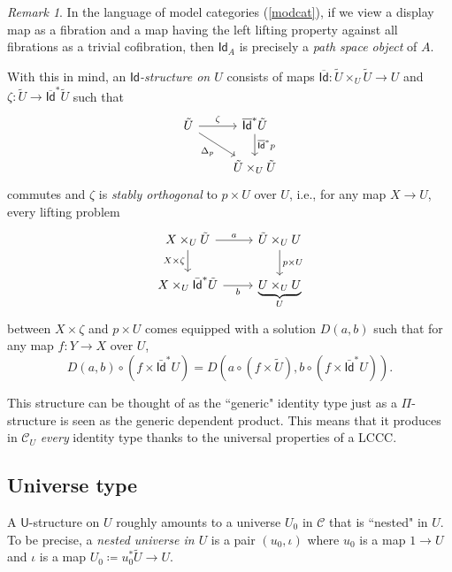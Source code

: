 \documentclass[10pt,letterpaper,cm]{nupset}
\theoremstyle{definition}
\theoremstyle{theorem}
\theoremstyle{remark}
\newtheorem{remark}[definition]{Remark}
\newcommand{\id}{\mathsf{Id}}
\newcommand{\U}{\mathsf{U}}
\newcommand{\0}{\mathbf{0}}
\newcommand{\1}{\mathbf{1}}
\newcommand{\2}{\mathbf{2}}
\renewcommand{\c}{\mathscr{C}}
\begin{document}
\begin{remark}\label{fibfact}
In the language of model categories (\cref{modcat}), if we view a  display map  as a fibration and a map having the left lifting property against all fibrations as a trivial cofibration, then $\id_A$ is precisely a \textit{path space object} of $A$.
\end{remark}

\medskip

With this in mind, an \textit{$\id$-structure on $U$} consists of maps  $\overline{\id}: \tilde{U} \times_U \tilde{U} \to U$ and $\zeta : \tilde{U} \to \overline{\id}^{\ast}{\tilde{U}}$ such that 
\[
\begin{tikzcd}
\tilde{U} \arrow[rd, "\Delta_p"'] \arrow[r, "\zeta"] & \overline{\id}^{\ast}{\tilde{U}} \arrow[d, "\overline{\id}^{\ast}{p}"] \\
                                                              & \tilde{U}\times_U\tilde{U}                                            
\end{tikzcd}
\] commutes and $\zeta$ is \textit{stably orthogonal} to $p \times U$ over $U$, i.e., for any map $X\to U$, every lifting problem
\[
\begin{tikzcd}
X\times_U \tilde{U} \arrow[d, "X\times \zeta"'] \arrow[r, "a"] & \tilde{U}\times_U U \arrow[d, "p \times U"] \\
X\times_U \bar{\id}^{\ast}{\tilde{U}} \arrow[r, "b"']         & \underbrace{U \times_U U}_{U}                               
\end{tikzcd}
\] between $X \times \zeta$ and $p \times U$ comes equipped with a solution $D(a,b)$ 
such that for any map $f: Y \to X$ over $U$,
\[
D\left(a,b\right) \circ \left(f \times \bar{\id}^{\ast}{U} \right) = D\left(a \circ \left(f \times \tilde{U}\right), b\circ \left(f \times \bar{\id}^{\ast}{U}\right)\right)
.\]


\medskip

This structure can be thought of as the ``generic" identity type just as a $\Pi$-structure is seen as the generic dependent product. This means that it produces  in $\c_U$ \emph{every} identity type thanks to the universal properties of a LCCC. 

\subsection*{Universe type}\label{internaluniv}

A $\U$-structure on $U$ roughly amounts to a universe $U_0$ in $\c$ that is ``nested" in $U$. To be precise, a \textit{nested universe in $U$} is a pair $\left(u_0, \iota\right)$ where $u_0$ is a map $1 \to U$ and $\iota$ is a map $U_0 \coloneqq u_0^{\ast}{\tilde{U}} \to U$. 
\end{document}
